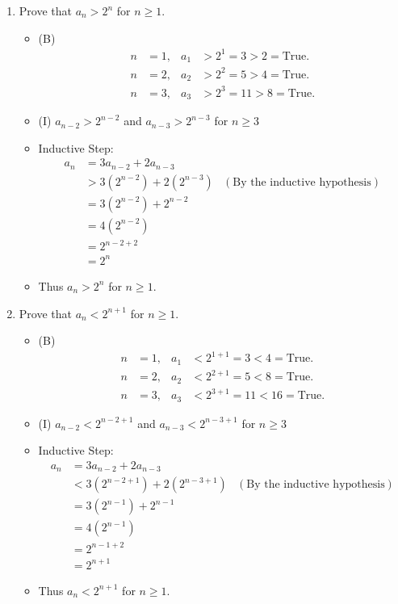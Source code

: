 \documentclass[12pt]{article}
\newcommand{\paren}[1]{\left(#1\right)}
\begin{document}
\begin{enumerate}
\begin{enumerate}
	\item Prove that $a_n>2^n$ for $n\geq1$.
		\begin{itemize}
		\item (B) 
			\begin{align*}
			n &= 1,  & a_1 &> 2^1 = 3 > 2 = \text{True.}\\
			n &= 2, & a_2 &> 2^2 = 5 > 4 = \text{True.}\\
			n &= 3, & a_3 &> 2^3 = 11> 8 = \text{True.}
			\end{align*}
		\item (I) $a_{n-2}>2^{n-2}$ and $a_{n-3}>2^{n-3}$ for $n\geq3$
		\item Inductive Step:
			\begin{align*}
			a_n &= 3a_{n-2} + 2a_{n-3} \\
			&> 3(2^{n-2}) + 2(2^{n-3}) & (\text{By the inductive hypothesis})\\
			&= 3(2^{n-2})+2^{n-2} \\
			&= 4\paren{2^{n-2}} \\
			&= 2^{n-2+2} \\
			&= 2^n
			\end{align*}
		\item Thus $a_n>2^n$ for $n\geq1$.
		\end{itemize}
		
	\item Prove that $a_n<2^{n+1}$ for $n\geq1$.
		\begin{itemize}
		\item (B)
			\begin{align*}
			n &= 1,  & a_1 &< 2^{1+1} = 3 < 4 = \text{True.}\\
			n &= 2, & a_2 &< 2^{2+1} = 5 < 8 = \text{True.}\\
			n &= 3, & a_3 &< 2^{3+1} = 11 < 16 = \text{True.}
			\end{align*}
		\item (I) $a_{n-2}<2^{n-2+1}$ and $a_{n-3}<2^{n-3+1}$ for $n\geq3$
		\item Inductive Step:
			\begin{align*}
			a_n &= 3a_{n-2} + 2a_{n-3} \\
			&< 3(2^{n-2+1}) + 2(2^{n-3+1}) & (\text{By the inductive hypothesis})\\
			&= 3(2^{n-1})+2^{n-1} \\
			&= 4\paren{2^{n-1}} \\
			&= 2^{n-1+2} \\
			&= 2^{n+1}
			\end{align*}
		\item Thus $a_n<2^{n+1}$ for $n\geq1$.
		\end{itemize}
		

\end{enumerate}
\end{enumerate}
\end{document}
